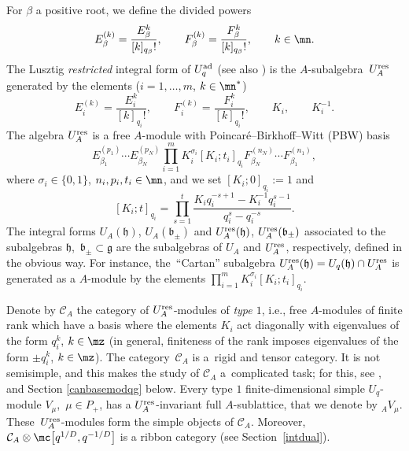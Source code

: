 For $\beta$ a positive root, we define the divided powers
\[E_{\beta}^{(k)} = \frac{E_\beta^k}{[k]_{q_\beta}!} , \qquad F_{\beta}^{(k)} = \frac{F_\beta^k}{[k]_{q_\beta}!}, \qquad k\in \mn.\]
The Lusztig {\it restricted} integral form of $U_q^{\rm ad}$ \cite{Lusztig2,Lusztig} (see also \cite[Chapter 9.3]{CP}) is the $A$-sub\-algebra~$U_A^{\rm res}$ generated by the elements ($i=1,\dots,m$, $k\in \mn^*$)
\[E_i^{(k)}= \frac{E_i^k}{[k]_{q_i}!},\qquad F_i^{(k)}= \frac{F_i^k}{[k]_{q_i}!} ,\qquad K_i ,\qquad K_i^{-1}.\]
The algebra $U_A^{\rm res}$ is a free $A$-module with Poincar\'e--Birkhoff--Witt (PBW) basis
\[%
E_{\beta_1}^{(p_1)}\cdots E_{\beta_N}^{(p_N)}\prod_{i=1}^m K_i^{\sigma_i}[ K_i; t_i]_{q_i} F_{\beta_N}^{(n_N)}\cdots F_{\beta_1}^{(n_1)},
\]
where $\sigma_i\in \{0,1\}$, $n_i,p_i, t_i\in \mn$, and we set $[ K_i; 0]_{q_i}:=1$ and
\[[ K_i; t ]_{q_i}= \prod_{s=1}^t \frac{K_iq_i^{-s+1}-K_i^{-1}q_i^{s-1}}{q_i^s-q_i^{-s}}.\]
The integral forms $U_A(\mathfrak{h})$, $U_A(\mathfrak{b}_\pm)$ and $U_A^{\rm res}(\mathfrak{h})$, $U_A^{\rm res}(\mathfrak{b}_\pm)$ associated to the subalgebras $\mathfrak{h}$,~$\mathfrak{b}_\pm \subset \mathfrak{g}$ are the subalgebras of $U_A$ and $U_A^{\rm res}$, respectively, defined in the obvious way. For instance, the~``Cartan'' subalgebra $U_A^{\rm res}(\mathfrak{h}) = U_q(\mathfrak{h})\cap U_A^{\rm res}$ is generated as a $A$-module by the elements $\prod_{i=1}^m K_i^{\sigma_i}[ K_i; t_i]_{q_i}$.

Denote by $\mathcal{C}_A$ the category of $U_A^{\rm res}$-modules of {\it type $1$}, i.e., free $A$-modules of finite rank which have a basis where the elements $K_i$ act diagonally with eigenvalues of the form $q_i^k$, $k\in \mz$ (in general, finiteness of the rank imposes eigenvalues of the form $\pm q_i^k$, $k\in \mz$). The category~$\mathcal{C}_A$ is a~rigid and tensor category. It is not semisimple, and this makes the study of $\mathcal{C}_A$ a~complicated task; for this, see \cite{BR}, and Section \ref{canbasemodqg} below. Every type $1$ finite-dimensional simple $U_q$-module $V_\mu$,~$\mu \in P_+$, has a $U_A^{\rm res}$-invariant full $A$-sublattice, that we denote by ${}_AV_\mu$. These~$U_A^{\rm res}$-modules form the simple objects of $\mathcal{C}_A$. Moreover, $\mathcal{C}_A \otimes \mc\big[q^{1/D},q^{-1/D}\big]$ is a ribbon category (see Section~\ref{intdual}).

